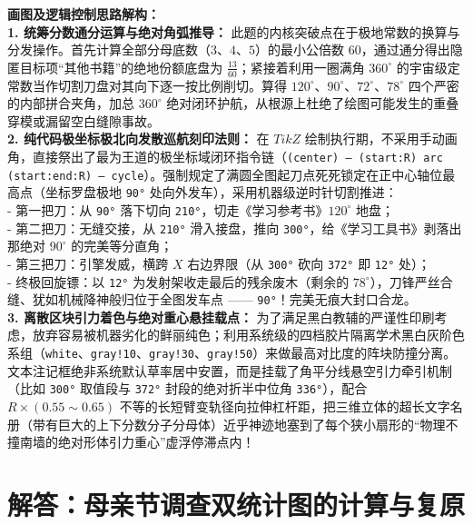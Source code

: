 \vspace{0.4cm}
{\small\color{blue!70!black}
\textbf{画图及逻辑控制思路解构：}\\
\textbf{1. 统筹分数通分运算与绝对角弧推导：} 此题的内核突破点在于极地常数的换算与分发操作。首先计算全部分母底数（$3、4、5$）的最小公倍数 60，通过通分得出隐匿目标项“其他书籍”的绝地份额底盘为 $\frac{13}{60}$；紧接着利用一圈满角 $360^\circ$ 的宇宙级定常数当作切割刀盘对其向下逐一按比例削切。算得 $120^\circ、90^\circ、72^\circ、78^\circ$ 四个严密的内部拼合夹角，加总 $360^\circ$ 绝对闭环护航，从根源上杜绝了绘图可能发生的重叠穿模或漏留空白缝隙事故。\\
\textbf{2. 纯代码极坐标极北向发散巡航刻印法则：} 在 $TikZ$ 绘制执行期，不采用手动画角，直接祭出了最为王道的极坐标域闭环指令链（\texttt{(center) -- (start:R) arc (start:end:R) -- cycle}）。强制规定了满圆全图起刀点死死锁定在正中心轴位最高点（坐标罗盘极地 \texttt{90°} 处向外发车），采用机器级逆时针切割推进：\\
- 第一把刀：从 \texttt{90°} 落下切向 \texttt{210°}，切走《学习参考书》$120^\circ$ 地盘；\\
- 第二把刀：无缝交接，从 \texttt{210°} 滑入接盘，推向 \texttt{300°}，给《学习工具书》剥落出那绝对 $90^\circ$ 的完美等分直角；\\
- 第三把刀：引擎发威，横跨 $X$ 右边界限（从 \texttt{300°} 砍向 \texttt{372°} 即 \texttt{12°} 处）；\\
- 终极回旋镖：以 \texttt{12°} 为发射架收走最后的残余废木（剩余的 $78^\circ$），刀锋严丝合缝、犹如机械降神般归位于全图发车点 —— \texttt{90°}！完美无痕大封口合龙。\\
\textbf{3. 离散区块引力着色与绝对重心悬挂载点：} 为了满足黑白教辅的严谨性印刷考虑，放弃容易被机器劣化的鲜丽纯色；利用系统级的四档胶片隔离学术黑白灰阶色系组（\texttt{white}、\texttt{gray!10}、\texttt{gray!30}、\texttt{gray!50}）来做最高对比度的阵块防撞分离。文本注记框绝非系统默认草率居中安置，而是挂载了角平分线悬空引力牵引机制（比如 \texttt{300°} 取值段与 \texttt{372°} 封段的绝对折半中位角 \texttt{336°}），配合 $R \times (0.55\sim 0.65)$ 不等的长短臂变轨径向拉伸杠杆距，把三维立体的超长文字名册（带有巨大的上下分数分子分母体）近乎神迹地塞到了每个狭小扇形的“物理不撞南墙的绝对形体引力重心”虚浮停滞点内！
}

\newpage



\section{解答：母亲节调查双统计图的计算与复原}


